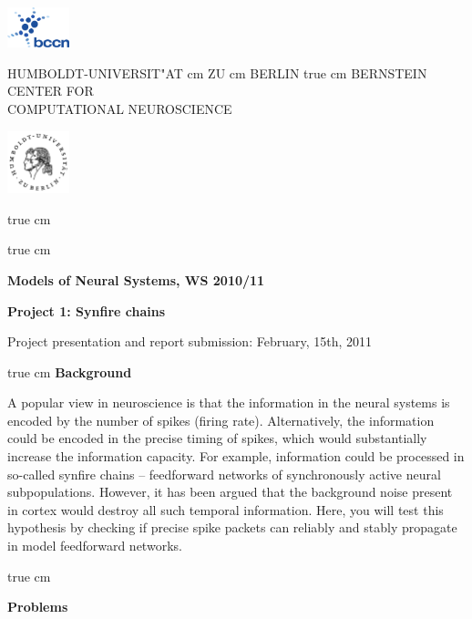 \documentclass[12pt]{article}
\begin{document}
\parbox{2cm}{
\includegraphics[width=1.8cm]{../bccnlogo.pdf}
}
\parbox{11cm}{
\begin{center}
\large HUMBOLDT-UNIVERSIT"AT  cm ZU  cm BERLIN
 true cm
\mgross BERNSTEIN CENTER FOR\\ COMPUTATIONAL NEUROSCIENCE
\end{center}
}
\parbox{2cm}
{
\hfill
\includegraphics[width=1.8cm]{../hublogo.pdf}
}

 true cm



 true cm
\centerline{\bf Models of Neural Systems, WS 2010/11}
\centerline{\bf Project 1: Synfire chains}
\centerline{Project presentation and report submission: February,
15th, 2011}

 true cm
{\bf Background}

 A popular view in neuroscience is that the information in
 the neural systems is encoded by the number of spikes (firing rate).
 Alternatively, the information could be encoded in the precise timing
 of spikes, which would substantially increase the information capacity.
 For example, information could be processed in so-called synfire
 chains -- feedforward networks of synchronously active
 neural subpopulations. However, it has been argued that the
 background noise present in cortex would destroy all such
 temporal information. Here, you will test this hypothesis by checking if precise
 spike packets can reliably and stably propagate in model feedforward
 networks.

 true cm

{\bf Problems}
\end{document}
